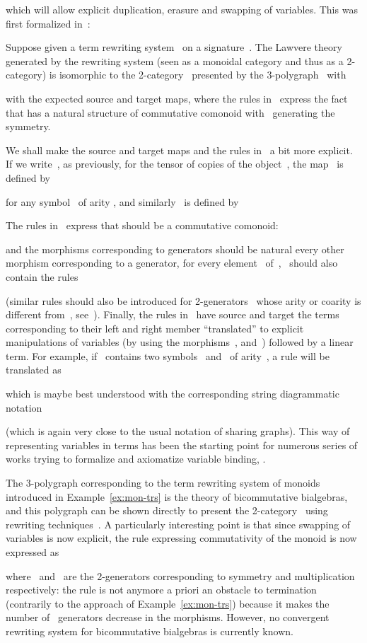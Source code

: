 \documentclass{LMCS}
\begin{document}
which will allow explicit duplication, erasure and swapping of variables. This
was first formalized in~\cite{burroni:higher-word}:

\begin{prop}
  Suppose given a term rewriting system~ on a signature~. The
  Lawvere theory  generated by the rewriting system (seen
  as a monoidal category and thus as a 2-category) is isomorphic to the
  2-category~ presented by the 3-polygraph~ with
  
  with the expected source and target maps, where the rules in~ express
  the fact that  has a natural structure of commutative
  comonoid with~ generating the symmetry.
\end{prop}

We shall make the source and target maps and the rules in~ a bit more
explicit. If we write~, as previously, for the tensor of  copies of the
object~, the map~ is defined by

for any symbol~ of arity , and similarly~ is defined by

The rules in~ express that  should be a commutative
comonoid:

and the morphisms corresponding to generators should be natural \wrt every other
morphism corresponding to a generator, \eg for every element~
of~, ~should also contain the rules

(similar rules should also be introduced for 2-generators~ whose arity or
coarity is different from~,
see~\cite{burroni:higher-word}). Finally, the rules in~ have source and
target the terms corresponding to their left and right member ``translated'' to
explicit manipulations of variables (by using the morphisms~, 
and~) followed by a linear term. For example, if~ contains two
symbols~ and~ of arity~, a rule  will
be translated as

which is maybe best understood with the corresponding string diagrammatic
notation

(which is again very close to the usual notation of sharing graphs). This way of
representing variables in terms has been the starting point for numerous series
of works trying to formalize and axiomatize variable binding, \eg
\cite{fiore-plotkin-turi:as-vb}.

\begin{exa}
  \label{ex:mon-poly}
  The 3-polygraph corresponding to the term rewriting system of monoids
  introduced in Example~\ref{ex:mon-trs} is the theory of bicommutative
  bialgebras, and this polygraph can be shown directly to present the
  2-category~ using rewriting techniques~\cite{lafont:boolean-circuits,
    mimram:phd, mimram:first-order-causality}. A particularly interesting point
  is that since swapping of variables is now explicit, the rule expressing
  commutativity of the monoid is now expressed as
  
  where~ and~ are the 2-generators corresponding to symmetry and
  multiplication respectively: the rule is not anymore a priori an obstacle to
  termination (contrarily to the approach of Example~\ref{ex:mon-trs}) because
  it makes the number of~ generators decrease in the morphisms. However,
  no convergent rewriting system for bicommutative bialgebras is currently
  known.
\end{exa}
\end{document}
